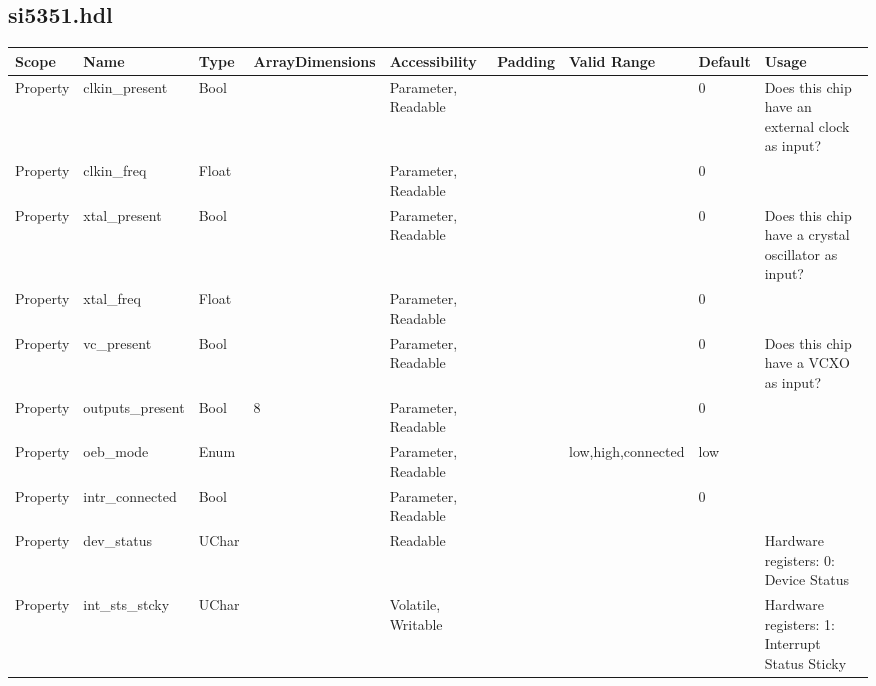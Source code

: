 \documentclass{article}
\def\comp{temp}
\def\comp{si5351}
\begin{document}
\begin{landscape}
	\subsection*{\comp.hdl}
	\begin{scriptsize}
		\begin{longtable}[l]{|p{2cm}|p{2cm}|p{1cm}|p{2cm}|p{1.7cm}|p{1cm}|p{2.5cm}|p{1cm}|p{5.88cm}|}
			\hline
			\rowcolor{blue}
			Scope        & Name                 & Type  &ArrayDimensions& Accessibility & Padding & Valid Range  & Default & Usage \\
			\hline
			Property     & clkin\_present       & Bool  &                 & Parameter, Readable &   &              & 0       & Does this chip have an external clock as input? \\
			\hline
			Property     & clkin\_freq          & Float &                 & Parameter, Readable &   &              & 0       &       \\
			\hline
			Property     & xtal\_present        & Bool  &                 & Parameter, Readable &   &              & 0       & Does this chip have a crystal oscillator as input? \\
			\hline
			Property     & xtal\_freq           & Float &                 & Parameter, Readable &   &              & 0       &       \\
			\hline
			Property     & vc\_present          & Bool  &                 & Parameter, Readable &   &              & 0       & Does this chip have a VCXO as input? \\
			\hline
			Property     & outputs\_present     & Bool  & 8               & Parameter, Readable &   &              & 0       &       \\
			\hline
			Property     & oeb\_mode            & Enum  &                 & Parameter, Readable &   & low,high,connected&low &       \\
			\hline
			Property     & intr\_connected      & Bool  &                 & Parameter, Readable &   &              & 0       &       \\
			\hline
      Property     & dev\_status          & UChar &                 & Readable            &   &              &         & Hardware registers: 0: Device Status \\
			\hline
      Property     & int\_sts\_stcky      & UChar &                 & Volatile, Writable  &   &              &         & Hardware registers: 1: Interrupt Status Sticky \\

\end{longtable}
\end{scriptsize}
\end{landscape}
\end{document}
